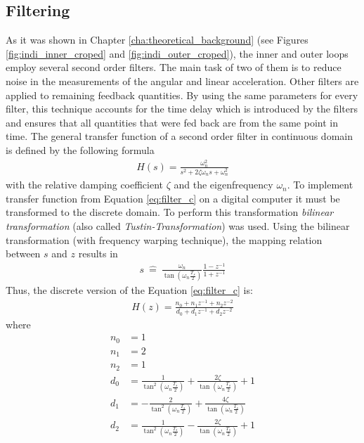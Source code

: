\documentclass[11pt, a4paper, twoside]{report}
\begin{document}
\subsection{Filtering} \label{subsec:filtering}

As it was shown in Chapter \ref{cha:theoretical_background} (see Figures \ref{fig:indi_inner_croped} and \ref{fig:indi_outer_croped}), the inner and outer loops employ several second order filters. The main task of two of them is to reduce  noise in the measurements of the angular and linear acceleration. Other filters are applied to remaining feedback quantities. By using the same parameters for every filter, this technique accounts for the time delay which is introduced by the filters and ensures that all quantities that were fed back are from the same point in time. The general transfer function of a second order filter in continuous domain is defined by the following formula
\begin{equation}
	\begin{split}
		H(s) = \frac{\omega_n^2}{s^2+2\zeta\omega_ns+\omega_n^2}
		\label{eq:filter_c}
	\end{split}
\end{equation}
with the relative damping coefficient $\zeta$ and the eigenfrequency $\omega_n$. To implement transfer function from Equation \ref{eq:filter_c} on a digital computer it must be transformed to the discrete domain. To perform this transformation \textit{bilinear transformation} (also called \textit{Tustin-Transformation}) was used. Using the bilinear transformation (with frequency warping technique), the mapping relation between $s$ and $z$ results in
\begin{equation}
	\begin{split}
		s \ \widehat{=} \ \frac{\omega_n}{\tan(\omega_n\frac{T_s}{2})} \frac{1-z^{-1}}{1+z^{-1}}
		\label{eq:filter_c}
	\end{split}
\end{equation}
Thus, the discrete version of the Equation \ref{eq:filter_c} is:
\begin{equation}
	\begin{split}
		H(z) = \frac{n_0 + n_1z^{-1} + n_2z^{-2}}{d_0 + d_1z^{-1} + d_2z^{-2}}
		\label{eq:filter_d}
	\end{split}
\end{equation}
where 
\begin{subequations}
	\begin{align}
		n_0 &= 1 \\
		n_1 &= 2\\
		n_2 &= 1 \\
		d_0 &= \frac{1}{\tan^2(\omega_n\frac{T_s}{2})} + \frac{2\zeta}{\tan(\omega_n\frac{T_s}{2})} + 1 \\
		d_1 &= -\frac{2}{\tan^2(\omega_n\frac{T_s}{2})} + \frac{4\zeta}{\tan(\omega_n\frac{T_s}{2})} \\
		d_2 &= \frac{1}{\tan^2(\omega_n\frac{T_s}{2})} - \frac{2\zeta}{\tan(\omega_n\frac{T_s}{2})} + 1
	\end{align}
	\label{eq:filter_parameters}
\end{subequations}
\end{document}
